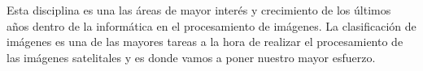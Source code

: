 Esta disciplina es una las áreas de mayor interés y crecimiento de los últimos años dentro de la informática en el procesamiento de imágenes. La clasificación de imágenes es una de las mayores tareas a la hora de realizar el procesamiento de  las imágenes satelitales y es donde vamos a poner nuestro mayor esfuerzo.










